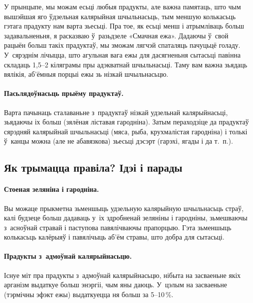 У прынцыпе, мы можам есьці любыя прадукты, але важна памятаць, што чым вышэйшая яго ўдзельная калярыйная шчыльнасьць, тым меншую колькасьць гэтага прадукту нам варта зьесьці. Пра тое, як есьці менш і атрымліваць больш задавальненьня, я расказваю ў~разьдзеле «Смачная ежа». Дадаючы ў~свой рацыён больш такіх прадуктаў, мы зможам лягчэй спаталяць пачуцьцё голаду. У~сярэднім лічыцца, што агульная вага ежы для дасягненьня сытасьці павінна складаць 1,5--2 кіляграмы пры адэкватнай шчыльнасьці. Таму вам важна зьядаць вялікія, аб'ёмныя порцыі ежы зь нізкай шчыльнасьцю.


\paragraph{Пасьлядоўнасьць прыёму прадуктаў.}
Варта пачынаць сталаваньне з~прадуктаў нізкай удзельнай калярыйнасьці, зьядаючы іх больш (зялёная ліставая гародніна). Затым пераходзіце да прадуктаў сярэдняй калярыйнай шчыльнасьці (мяса, рыба, крухмалістая гародніна) і толькі ў~канцы можна (але не абавязкова) зьесьці дэсэрт (гарэхі, ягады і да т.~п.).

\subsection{Як трымацца правіла? Ідэі і парады}

\paragraph{Стоеная зеляніна і гародніна.}
Вы можаце прыкметна зьменшыць удзельную калярыйную шчыльнасьць страў, калі будзеце больш дадаваць у~іх здробненай зеляніны і гародніны, зьмешваючы з~асноўнай стравай і паступова павялічваючы прапорцыю. Гэта зьменшыць колькасьць калёрыяў і павялічыць аб'ём стравы, што добра для сытасьці.

\paragraph{Прадукты з~адмоўнай калярыйнасьцю.}
Існуе міт пра прадукты з~адмоўнай калярыйнасьцю, нібыта на засваеньне якіх арганізм выдаткуе больш энэргіі, чым яны даюць. У~цэлым на засваеньне (тэрмічны эфэкт ежы) выдаткуецца ня больш за 5--10\,\%.

